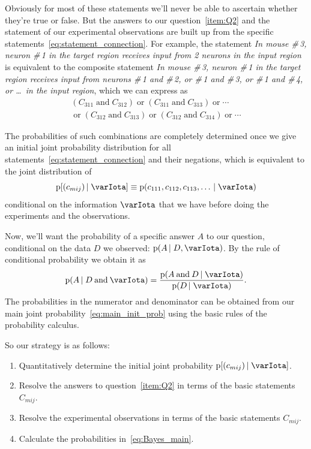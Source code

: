 \documentclass[\ifafour a4paper,12pt,\else a5paper,10pt,\fi%
onecolumn,oneside,article,%
british%
]{memoir}
\theoremstyle{remark}
\theoremstyle{innote}
\newcommand*{\pf}{\mathrm{p}}%
\renewcommand*{\|}[1][]{\nonscript\,#1\vert\nonscript\;\mathopen{}}
\newcommand*{\yI}{\varIota}
\newcommand*{\yC}{C}
\newcommand*{\yc}{c}
\newcommand*{\statm}[1]{\textsl{\textsf{#1}}}
\begin{document}
Obviously for most of these statements we'll never be able to ascertain
whether they're true or false. But the answers to our
question~\ref{item:Q2} and the statement of our experimental observations
are built up from the specific statements~\eqref{eq:statement_connection}.
For example, the statement \statm{In mouse \#\,3, neuron \#\,1 in the
  target region receives input from 2 neurons in the input region} is
equivalent to the composite statement \statm{In mouse \#\,3, neuron \#\,1
  in the target region receives input from neurons \#\,1 and \#\,2, or
  \#\,1 and \#\,3, or \#\,1 and \#\,4, or \ldots\ in the input region},
which we can express as
\begin{multline}
  (\yC_{311} \mathbin{\text{and}} \yC_{312}) \mathbin{\text{or}}
  (\yC_{311} \mathbin{\text{and}} \yC_{313}) \mathbin{\text{or}}
  \dotsb{}\\ {}\mathbin{\text{or}}
  (\yC_{312} \mathbin{\text{and}} \yC_{313}) \mathbin{\text{or}}
  (\yC_{312} \mathbin{\text{and}} \yC_{314}) \mathbin{\text{or}}
  \dotsb{}
\end{multline}

The probabilities of such combinations are completely determined once we
give an initial joint probability distribution for all
statements~\eqref{eq:statement_connection} and their negations, which is
equivalent to the joint distribution of 
\begin{equation}
  \pf[(\yc_{mij}) \| \yI] \equiv
  \pf(\yc_{111}, \yc_{112},\yc_{113},\dotsc \| \yI)
  \label{eq:main_init_prob}
\end{equation}
conditional on the information $\yI$ that we have before doing the
experiments and the observations.

Now, we'll want the probability of a specific answer $A$ to our question,
conditional on the data $D$ we observed: $\pf(A \| D,\yI)$. By the rule of
conditional probability we obtain it as
\begin{equation}
  \label{eq:Bayes_main}
  \pf(A \| D \mathbin{\text{and}} \yI) =
\frac{\pf(A \mathbin{\text{and}} D \| \yI)}{\pf(D \| \yI)}.
\end{equation}
The probabilities in the  numerator and denominator can be obtained from
our main joint probability~\eqref{eq:main_init_prob} using the basic rules
of the probability calculus.

\medskip

So our strategy is as follows:
\begin{enumerate}
\item Quantitatively determine the initial joint probability
  $\pf[(\yc_{mij}) \| \yI]$.
\item Resolve the answers to question~\ref{item:Q2} in terms of the basic
  statements $\yC_{mij}$.
\item Resolve the experimental observations in terms of the basic
  statements $\yC_{mij}$.
\item Calculate the probabilities in~\eqref{eq:Bayes_main}.
\end{enumerate}
\end{document}
